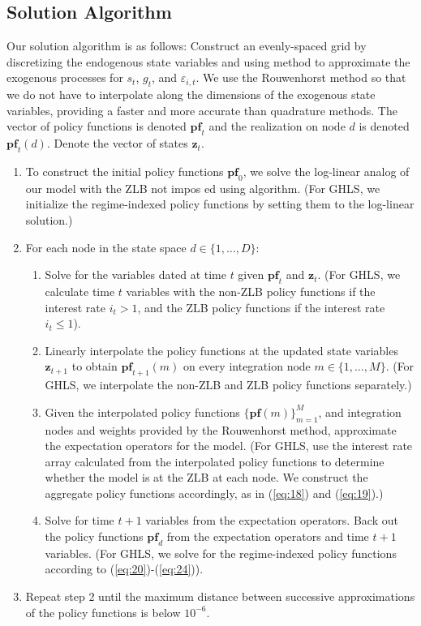 \documentclass[12pt, final]{article}
\begin{document}
\subsection{Solution Algorithm}
Our solution algorithm is as follows: Construct an evenly-spaced grid by discretizing the endogenous state variables and using \hyperlink{Rouwenhorst}{\color{black}{Rouwenhorst (1995)}} method to approximate the exogenous processes for $s_t$, $g_t$, and $\varepsilon_{i,t}$. We use the Rouwenhorst method so that we do not have to interpolate along the dimensions of the exogenous state variables, providing a faster and more accurate than quadrature methods. The vector of policy functions is denoted $\textbf{pf}_t$ and the realization on node $d$ is denoted $\textbf{pf}_t(d)$. Denote the vector of states $\textbf{z}_t$. 
\begin{enumerate} 
\item To construct the initial policy functions $\textbf{pf}_0$, we solve the log-linear analog of our model with the ZLB not impos
ed using \hyperlink{Sims}{} algorithm. (For GHLS, we initialize the regime-indexed policy functions by setting them to the log-linear solution.)
\item For each node in the state space $d \in \{1,\dots,D\}:$
\begin{enumerate}
\item Solve for the variables dated at time $t$ given $\textbf{pf}_t$ and $\textbf{z}_t$. (For GHLS, we calculate time $t$ variables with the non-ZLB policy functions if the interest rate $i_t > 1$, and the ZLB policy functions if the interest rate $i_t \leq 1$). 
\item  Linearly interpolate the policy functions at the updated state variables $\textbf{z}_{t+1}$ to obtain $\textbf{pf}_{t+1}(m)$ on every integration node $m \in \{1,\dots,M\}$. (For GHLS, we interpolate the non-ZLB and ZLB policy functions separately.)
\item Given the interpolated policy functions $\{\textbf{pf}(m)\}_{m=1}^M$, and integration nodes and weights provided by the Rouwenhorst method, approximate the expectation operators for the model. (For GHLS, use the interest rate array calculated from the interpolated policy functions to determine whether the model is at the ZLB at each node. We construct the aggregate policy functions accordingly, as in (\ref{eq:18}) and (\ref{eq:19}).)
\item Solve for time $t+1$ variables from the expectation operators. Back out the policy functions $\textbf{pf}_{d}$ from the expectation operators and time $t+1$ variables. (For GHLS, we solve for the regime-indexed policy functions according to (\ref{eq:20})-(\ref{eq:24})).
\end{enumerate}
\item Repeat step 2 until the maximum distance between successive approximations of the policy functions is below $10^{-6}$. 
\end{enumerate}
\end{document}
